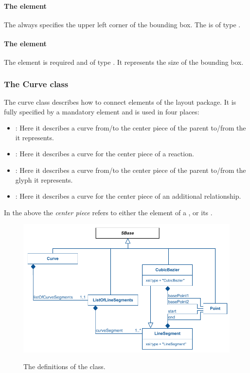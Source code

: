 \paragraph{The  element} The  always 
specifies the upper left corner of the bounding box. The 
 is of type \Point. 

\paragraph{The  element} The  
element is required and of type \Dimensions. It represents the size of
the bounding box.

\subsubsection{The Curve class } \label{curve-class} The curve class 
describes how to connect elements of the layout package. It is fully 
specified by a mandatory  element and is used 
in four places: 

\begin{itemize}

	\item {\SpeciesReferenceGlyph: Here it describes a curve from/to 
	the center piece of the parent \ReactionGlyph to/from the 
	\SpeciesGlyph it represents.}
	\item {\ReactionGlyph: Here it describes a curve for the 
	center piece of a reaction. }	
	\item {\ReferenceGlyph: Here it describes a curve from/to 
	the center piece of the parent \GeneralGlyph to/from the glyph 
	it represents.}
	\item {\GeneralGlyph: Here it describes a curve for the 
	center piece of an additional relationship. }	
	
\end{itemize}

In the above the \textit{center piece} refers to either the \Curve 
element of a \ReactionGlyph, or its \BoundingBox. 

\begin{figure}[!h]
\includegraphics{uml/layout-curve-uml}\\
\caption{The definitions of the \Curve class.}
\label{uml:curve}
\end{figure}

